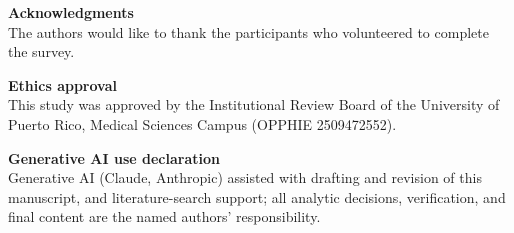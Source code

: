 \documentclass[12pt]{article}
\begin{document}
\vspace{1em}
\noindent\textbf{Acknowledgments}\\
The authors would like to thank the participants who volunteered to complete the survey.

\vspace{1em}
\noindent\textbf{Ethics approval}\\
This study was approved by the Institutional Review Board of the University of Puerto Rico, Medical
Sciences Campus (OPPHIE 2509472552).

\vspace{1em}
\noindent\textbf{Generative AI use declaration}\\
Generative AI
(Claude, Anthropic) assisted with drafting and revision of
this manuscript, and literature-search support; all analytic decisions, verification, and final content
are the named authors' responsibility.
\end{document}
